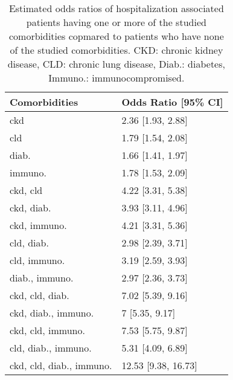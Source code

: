 \begin{table}[!htbp]
\centering
\begin{tabular}{ll}
  \hline
Comorbidities & Odds Ratio [95\% CI] \\ 
  \hline
ckd & 2.36 [1.93, 2.88] \\ 
  cld & 1.79 [1.54, 2.08] \\ 
  diab. & 1.66 [1.41, 1.97] \\ 
  immuno. & 1.78 [1.53, 2.09] \\ 
  ckd, cld & 4.22 [3.31, 5.38] \\ 
  ckd, diab. & 3.93 [3.11, 4.96] \\ 
  ckd, immuno. & 4.21 [3.31, 5.36] \\ 
  cld, diab. & 2.98 [2.39, 3.71] \\ 
  cld, immuno. & 3.19 [2.59, 3.93] \\ 
  diab., immuno. & 2.97 [2.36, 3.73] \\ 
  ckd, cld, diab. & 7.02 [5.39, 9.16] \\ 
  ckd, diab., immuno. & 7 [5.35, 9.17] \\ 
  ckd, cld, immuno. & 7.53 [5.75, 9.87] \\ 
  cld, diab., immuno. & 5.31 [4.09, 6.89] \\ 
  ckd, cld, diab., immuno. & 12.53 [9.38, 16.73] \\ 
   \hline
\end{tabular}
\caption{Estimated odds ratios of hospitalization associated patients having one or more of the studied comorbidities copmared to patients who have none of the studied comorbidities. CKD: chronic kidney disease, CLD: chronic lung disease, Diab.: diabetes, Immuno.: immunocompromised.} 
\label{tab:logistic_odds_hospital}
\end{table}

